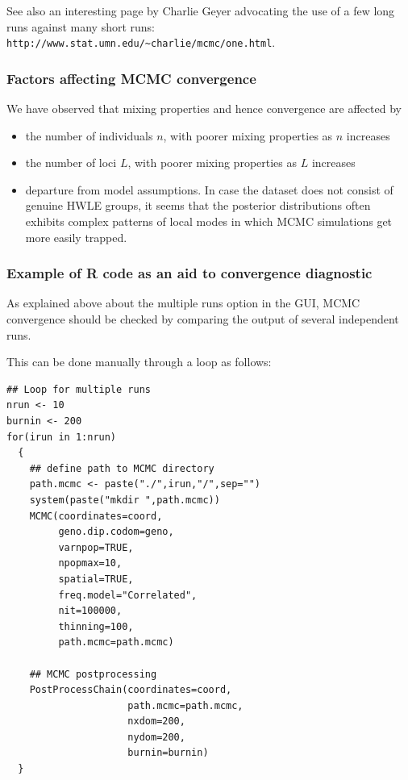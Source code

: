\documentclass[a4paper,10pt]{article}
\begin{document}
See also an interesting page by Charlie Geyer advocating the use of a few long runs against many short runs:
\texttt{http://www.stat.umn.edu/\~{ }charlie/mcmc/one.html}.

\subsubsection{Factors affecting MCMC convergence}\label{sec:fact_MCMC_conv}

We have observed that mixing properties and hence convergence are affected by 

\begin{itemize}
\item the number of individuals $n$,  with poorer mixing properties as $n$ increases 
\item the number of loci $L$, with poorer mixing properties as $L$ increases 
\item departure from model assumptions. In case the dataset does not consist of genuine HWLE groups, it seems 
that the posterior distributions often exhibits  complex patterns of local modes in which MCMC simulations 
get more easily trapped. 
\end{itemize} 


\subsubsection{Example of R code as an aid to convergence diagnostic}
As explained above about the multiple runs option in the GUI, MCMC convergence should be checked by comparing the output of 
several independent runs. 

This can be done manually through a loop as follows:\\




\begin{verbatim}
## Loop for multiple runs
nrun <- 10
burnin <- 200
for(irun in 1:nrun)
  {
    ## define path to MCMC directory
    path.mcmc <- paste("./",irun,"/",sep="")   
    system(paste("mkdir ",path.mcmc))
    MCMC(coordinates=coord,
         geno.dip.codom=geno,
         varnpop=TRUE, 
         npopmax=10,
         spatial=TRUE,
         freq.model="Correlated",
         nit=100000,
         thinning=100,
         path.mcmc=path.mcmc)

    ## MCMC postprocessing
    PostProcessChain(coordinates=coord,
                     path.mcmc=path.mcmc,
                     nxdom=200,
                     nydom=200,
                     burnin=burnin)
  }
\end{verbatim}
\end{document}
